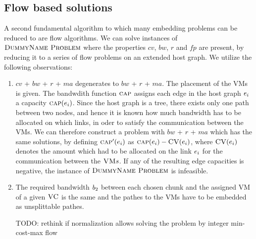 \subsection{Flow based solutions}

A second fundamental algorithm to which many embedding problems can be reduced 
to are flow algorithms. We can solve instances of $\textsc{DummyName Problem}$ where the 
properties $cv$, $bw$, $r$ and $fp$ are present, by reducing it to a series of 
flow problems on an extended host graph. We utilize the following observations:

\newcommand{\Source}{\ensuremath{s}}
\newcommand{\Sink}{\ensuremath{t}}

\begin{enumerate}
\item $cv$ + $bw$ + $r$ + $ma$ degenerates to  $bw$ + $r$ + $ma$. 
The placement of the VMs is given. The bandwdith function $\textsc{cap}$ assigns 
each edge in the host graph $e_i$ a capacity 
$\textsc{cap}(e_i)$. Since the 
host graph is a tree, there exists only one path between two nodes, and hence 
it is known how much bandwidth has to be allocated on which links, in oder to 
satisfy the communication between the VMs. We can therefore construct a 
problem with $bw$ + $r$ + $ma$ which has the same solutions, by defining 
$\textsc{cap}'(e_i)$ as 
$\textsc{cap}(e_i) - \textsc{CV}(e_i)$, where 
$\textsc{CV}(e_i)$ denotes the amount which 
had to be allocated on the link $e_i$ for the communication 
between the $\textsc{VM} s$. If any of the resulting edge capacities is negative, the 
instance of $\textsc{DummyName Problem}$ is infeasible.
\item The required bandwidth $b_2$ between each chosen chunk and the 
assigned VM of a given $\textsc{VC}$ is 
the same and the pathes to the VMs have to be embedded as unsplittable 
pathes.

TODO: rethink if normalization allows solving the problem by integer min-cost-max flow


\end{enumerate}

